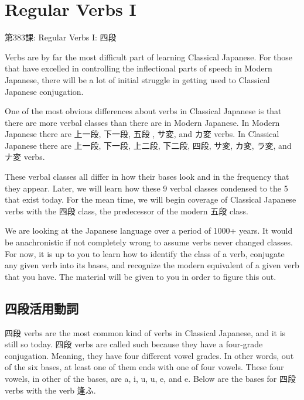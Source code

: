     
\chapter{Regular Verbs I}

\begin{center}
\begin{Large}
第383課: Regular Verbs I: 四段 
\end{Large}
\end{center}
 
\par{Verbs are by far the most difficult part of learning Classical Japanese. For those that have excelled in controlling the inflectional parts of speech in Modern Japanese, there will be a lot of initial struggle in getting used to Classical Japanese conjugation. }

\par{One of the most obvious differences about verbs in Classical Japanese is that there are more verbal classes than there are in Modern Japanese. In Modern Japanese there are 上一段, 下一段, 五段 , サ変, and カ変 verbs. In Classical Japanese there are 上一段, 下一段, 上二段, 下二段, 四段, サ変, カ変, ラ変, and ナ変 verbs. }

\par{These verbal classes all differ in how their bases look and in the frequency that they appear. Later, we will learn how these 9 verbal classes condensed to the 5 that exist today. For the mean time, we will begin coverage of Classical Japanese verbs with the 四段 class, the predecessor of the modern 五段 class. }

\par{We are looking at the Japanese language over a period of 1000+ years. It would be anachronistic if not completely wrong to assume verbs never changed classes. For now, it is up to you to learn how to identify the class of a verb, conjugate any given verb into its bases, and recognize the modern equivalent of a given verb that you have. The material will be given to you in order to figure this out. }
      
\section{四段活用動詞}
 
\par{四段 verbs are the most common kind of verbs in Classical Japanese, and it is still so today. 四段 verbs are called such because they have a four-grade conjugation. Meaning, they have four different vowel grades. In other words, out of the six bases, at least one of them ends with one of four vowels. These four vowels, in other of the bases, are a, i, u, u, e, and e. Below are the bases for 四段 verbs with the verb 逢ふ. }

